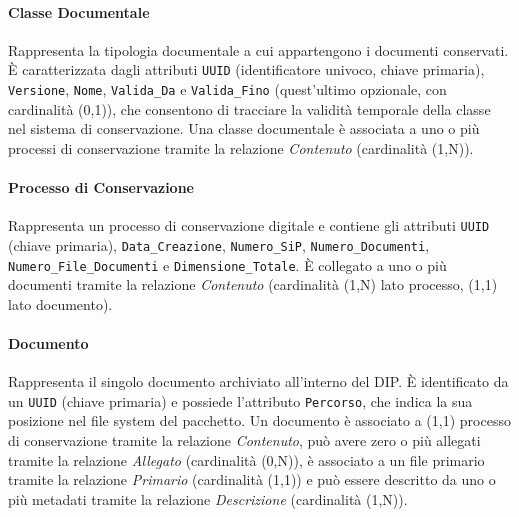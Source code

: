 \documentclass[a4paper,12pt]{article}
\begin{document}
{{{            \paragraph{Classe Documentale}
                Rappresenta la tipologia documentale a cui appartengono i documenti conservati.
                È caratterizzata dagli attributi \texttt{UUID} (identificatore univoco, chiave 
                primaria), \texttt{Versione}, \texttt{Nome}, \texttt{Valida\_Da} e 
                \texttt{Valida\_Fino} (quest'ultimo opzionale, con cardinalità (0,1)), che 
                consentono di tracciare la validità temporale della classe nel sistema di 
                conservazione. Una classe documentale è associata a uno o più processi di 
                conservazione tramite la relazione \textit{Contenuto} (cardinalità (1,N)).

            \paragraph{Processo di Conservazione}
                Rappresenta un processo di conservazione digitale e contiene gli attributi 
                \texttt{UUID} (chiave primaria), \texttt{Data\_Creazione}, 
                \texttt{Numero\_SiP}, \texttt{Numero\_Documenti}, 
                \texttt{Numero\_File\_Documenti} e \texttt{Dimensione\_Totale}. 
                È collegato a uno o più documenti tramite la relazione \textit{Contenuto} 
                (cardinalità (1,N) lato processo, (1,1) lato documento).

            \paragraph{Documento}
                Rappresenta il singolo documento archiviato all'interno del DIP. 
                È identificato da un \texttt{UUID} (chiave primaria) e possiede l'attributo 
                \texttt{Percorso}, che indica la sua posizione nel file system del pacchetto. 
                Un documento è associato a (1,1) processo di conservazione tramite 
                la relazione \textit{Contenuto}, può avere zero o più allegati tramite la 
                relazione \textit{Allegato} (cardinalità (0,N)), è associato a un file 
                primario tramite la relazione \textit{Primario} (cardinalità (1,1)) e può 
                essere descritto da uno o più metadati tramite la relazione 
                \textit{Descrizione} (cardinalità (1,N)).

}}}
\end{document}
